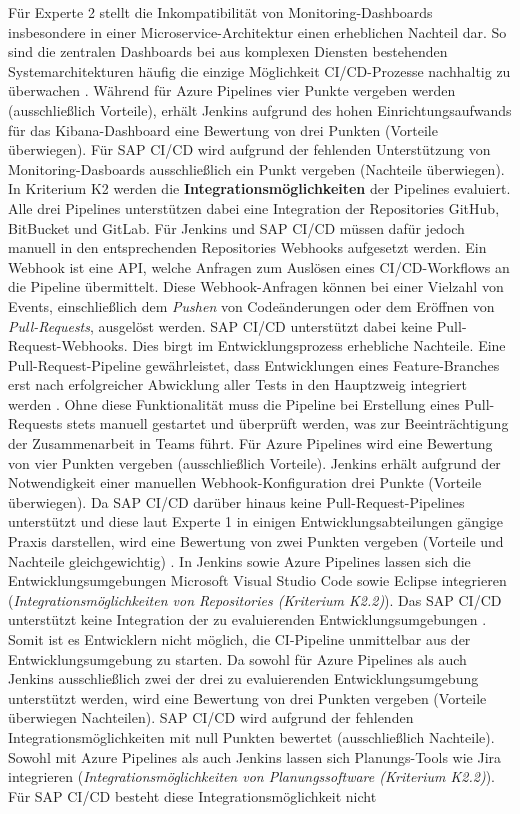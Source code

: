  Für Experte 2 stellt die Inkompatibilität von Monitoring-Dashboards insbesondere in einer Microservice-Architektur einen erheblichen Nachteil dar. So sind die zentralen Dashboards bei aus komplexen Diensten bestehenden Systemarchitekturen häufig die einzige Möglichkeit CI/CD-Prozesse nachhaltig zu überwachen \cite[Z. 38 ff.]{ProductManagerSAPHyperspaceCICD.}. Während für Azure Pipelines vier Punkte vergeben werden (ausschließlich Vorteile), erhält Jenkins aufgrund des hohen Einrichtungsaufwands für das Kibana-Dashboard eine Bewertung von drei Punkten (Vorteile überwiegen). Für SAP CI/CD wird aufgrund der fehlenden Unterstützung von Monitoring-Dasboards ausschließlich ein Punkt vergeben (Nachteile überwiegen). In Kriterium K2 werden die \textbf{Integrationsmöglichkeiten} der Pipelines evaluiert. Alle drei Pipelines unterstützen dabei eine Integration der Repositories GitHub, BitBucket und GitLab. Für Jenkins und SAP CI/CD müssen dafür jedoch manuell in den entsprechenden Repositories Webhooks aufgesetzt werden. Ein Webhook ist eine API, welche Anfragen zum Auslösen eines CI/CD-Workflows an die Pipeline übermittelt. Diese Webhook-Anfragen können bei einer Vielzahl von Events, einschließlich dem \textit{Pushen} von Codeänderungen oder dem Eröffnen von \textit{Pull-Requests}, ausgelöst werden. SAP CI/CD unterstützt dabei keine Pull-Request-Webhooks. Dies birgt im Entwicklungsprozess erhebliche Nachteile. Eine Pull-Request-Pipeline gewährleistet, dass Entwicklungen eines Feature-Branches erst nach erfolgreicher Abwicklung aller Tests in den Hauptzweig integriert werden \cite[Z. 27 ff.]{ProductOwnerSAPBTPProd&Infra.}. Ohne diese Funktionalität muss die Pipeline bei Erstellung eines Pull-Requests stets manuell gestartet und überprüft werden, was zur Beeinträchtigung der Zusammenarbeit in Teams führt. Für Azure Pipelines wird eine Bewertung von vier Punkten vergeben (ausschließlich Vorteile). Jenkins erhält aufgrund der Notwendigkeit einer manuellen Webhook-Konfiguration drei Punkte (Vorteile überwiegen). Da SAP CI/CD darüber hinaus keine Pull-Request-Pipelines unterstützt und diese laut Experte 1 in einigen Entwicklungsabteilungen gängige Praxis darstellen, wird eine Bewertung von zwei Punkten vergeben (Vorteile und Nachteile gleichgewichtig) \cite[Z. 27 ff.]{ProductOwnerSAPBTPProd&Infra.}. In Jenkins sowie Azure Pipelines lassen sich die Entwicklungsumgebungen Microsoft Visual Studio Code sowie Eclipse integrieren (\textit{Integrationsmöglichkeiten von Repositories (Kriterium K2.2)}). Das SAP CI/CD unterstützt keine Integration der zu evaluierenden Entwicklungsumgebungen \cite[Z. 94 ff.]{ProductOwnerSAPBTPProd&Infra.}. Somit ist es Entwicklern nicht möglich, die CI-Pipeline unmittelbar aus der Entwicklungsumgebung zu starten. Da sowohl für Azure Pipelines als auch Jenkins ausschließlich zwei der drei zu evaluierenden Entwicklungsumgebung unterstützt werden, wird eine Bewertung von drei Punkten vergeben (Vorteile überwiegen Nachteilen). SAP CI/CD wird aufgrund der fehlenden Integrationsmöglichkeiten mit null Punkten bewertet (ausschließlich Nachteile). Sowohl mit Azure Pipelines als auch Jenkins lassen sich Planungs-Tools wie Jira integrieren (\textit{Integrationsmöglichkeiten von Planungssoftware (Kriterium K2.2)}). Für SAP CI/CD besteht diese Integrationsmöglichkeit nicht 